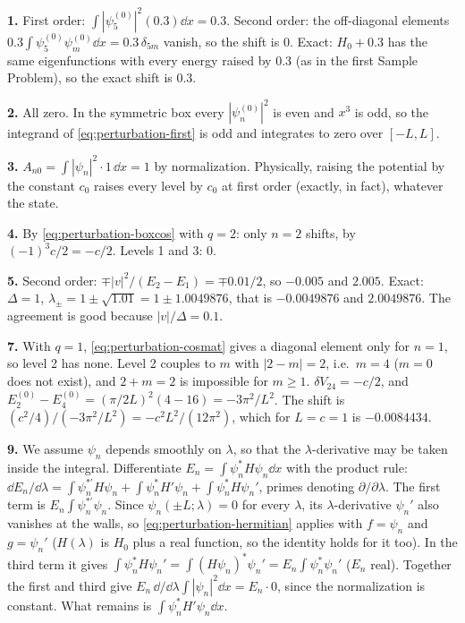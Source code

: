 \textbf{1.} First order: $\int|\psi_5^{(0)}|^2(0.3)\dd x=0.3$. Second order: the off-diagonal elements $0.3\int\psi_5^{(0)}\psi_m^{(0)}\dd x=0.3\,\delta_{5m}$ vanish, so the shift is 0. Exact: $H_0+0.3$ has the same eigenfunctions with every energy raised by $0.3$ (as in the first Sample Problem), so the exact shift is $0.3$.

\textbf{2.} All zero. In the symmetric box every $|\psi_n^{(0)}|^2$ is even and $x^3$ is odd, so the integrand of \cref{eq:perturbation-first} is odd and integrates to zero over $[-L,L]$.

\textbf{3.} $A_{n0}=\int|\psi_n|^2\cdot1\,\dd x=1$ by normalization. Physically, raising the potential by the constant $c_0$ raises every level by $c_0$ at first order (exactly, in fact), whatever the state.

\textbf{4.} By \cref{eq:perturbation-boxcos} with $q=2$: only $n=2$ shifts, by $(-1)^{3}c/2=-c/2$. Levels 1 and 3: 0.

\textbf{5.} Second order: $\mp|v|^2/(E_2-E_1)=\mp0.01/2$, so $-0.005$ and $2.005$. Exact: $\Delta=1$, $\lambda_\pm=1\pm\sqrt{1.01}=1\pm1.0049876$, that is $-0.0049876$ and $2.0049876$. The agreement is good because $|v|/\Delta=0.1$.

\textbf{7.} With $q=1$, \cref{eq:perturbation-cosmat} gives a diagonal element only for $n=1$, so level 2 has none. Level 2 couples to $m$ with $|2-m|=2$, i.e.\ $m=4$ ($m=0$ does not exist), and $2+m=2$ is impossible for $m\ge1$. $\delta V_{24}=-c/2$, and $E_2^{(0)}-E_4^{(0)}=(\pi/2L)^2(4-16)=-3\pi^2/L^2$. The shift is $(c^2/4)/(-3\pi^2/L^2)=-c^2L^2/(12\pi^2)$, which for $L=c=1$ is $-0.0084434$.

\textbf{9.} We assume $\psi_n$ depends smoothly on $\lambda$, so that the $\lambda$-derivative may be taken inside the integral. Differentiate $E_n=\int\psi_n^*H\psi_n\dd x$ with the product rule: $\dd E_n/\dd\lambda=\int\psi_n^{*\prime}H\psi_n+\int\psi_n^*H'\psi_n+\int\psi_n^*H\psi_n'$, primes denoting $\partial/\partial\lambda$. The first term is $E_n\int\psi_n^{*\prime}\psi_n$. Since $\psi_n(\pm L;\lambda)=0$ for every $\lambda$, its $\lambda$-derivative $\psi_n'$ also vanishes at the walls, so \cref{eq:perturbation-hermitian} applies with $f=\psi_n$ and $g=\psi_n'$ ($H(\lambda)$ is $H_0$ plus a real function, so the identity holds for it too). In the third term it gives $\int\psi_n^*H\psi_n'=\int(H\psi_n)^*\psi_n'=E_n\int\psi_n^*\psi_n'$ ($E_n$ real). Together the first and third give $E_n\,\dd/\dd\lambda\int|\psi_n|^2\dd x=E_n\cdot0$, since the normalization is constant. What remains is $\int\psi_n^*H'\psi_n\dd x$.

